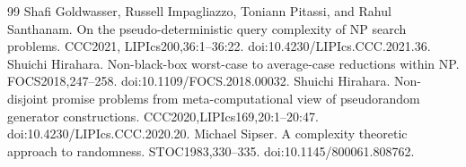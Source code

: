 \begin{thebibliography}{99}
 Shafi Goldwasser, Russell Impagliazzo, Toniann Pitassi, and Rahul Santhanam. On the pseudo-deterministic query complexity of NP search problems. CCC2021, LIPIcs200,36:1--36:22. doi:10.4230/LIPIcs.CCC.2021.36.
 Shuichi Hirahara. Non-black-box worst-case to average-case reductions within NP. FOCS2018,247--258. doi:10.1109/FOCS.2018.00032.
 Shuichi Hirahara. Non-disjoint promise problems from meta-computational view of pseudorandom generator constructions. CCC2020,LIPIcs169,20:1--20:47. doi:10.4230/LIPIcs.CCC.2020.20.
 Michael Sipser. A complexity theoretic approach to randomness. STOC1983,330--335. doi:10.1145/800061.808762.
\end{thebibliography}
